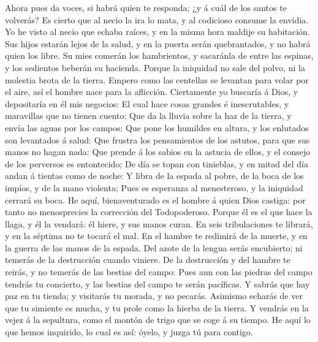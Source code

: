  Ahora pues da voces, si habrá quien te responda; ¿y á
cuál de los santos te volverás?  Es cierto que al necio la
ira lo mata, y al codicioso consume la envidia.  Yo he
visto al necio que echaba raíces, y en la misma hora maldije su
habitación.  Sus hijos estarán lejos de la salud, y en la
puerta serán quebrantados, y no habrá quien los libre.  Su
mies comerán los hambrientos, y sacaránla de entre las espinas, y los
sedientos beberán su hacienda.  Porque la iniquidad no
sale del polvo, ni la molestia brota de la tierra.  Empero
como las centellas se levantan para volar por el aire, así el hombre
nace para la aflicción.  Ciertamente yo buscaría á Dios, y
depositaría en él mis negocios:  El cual hace cosas
grandes é inescrutables, y maravillas que no tienen cuento:
 Que da la lluvia sobre la haz de la tierra, y envía las
aguas por los campos:  Que pone los humildes en altura, y
los enlutados son levantados á salud:  Que frustra los
pensamientos de los astutos, para que sus manos no hagan nada:
 Que prende á los sabios en la astucia de ellos, y el
consejo de los perversos es entontecido;  De día se topan
con tinieblas, y en mitad del día andan á tientas como de noche:
 Y libra de la espada al pobre, de la boca de los impíos,
y de la mano violenta;  Pues es esperanza al menesteroso,
y la iniquidad cerrará su boca.  He aquí, bienaventurado
es el hombre á quien Dios castiga: por tanto no menosprecies la
corrección del Todopoderoso.  Porque él es el que hace la
llaga, y él la vendará: él hiere, y sus manos curan.  En
seis tribulaciones te librará, y en la séptima no te tocará el mal.
 En el hambre te redimirá de la muerte, y en la guerra de
las manos de la espada.  Del azote de la lengua serás
encubierto; ni temerás de la destrucción cuando viniere. 
De la destrucción y del hambre te reirás, y no temerás de las bestias
del campo:  Pues aun con las piedras del campo tendrás tu
concierto, y las bestias del campo te serán pacíficas.  Y
sabrás que hay paz en tu tienda; y visitarás tu morada, y no pecarás.
 Asimismo echarás de ver que tu simiente es mucha, y tu
prole como la hierba de la tierra.  Y vendrás en la vejez
á la sepultura, como el montón de trigo que se coge á su tiempo.
 He aquí lo que hemos inquirido, lo cual es así: óyelo, y
juzga tú para contigo.

